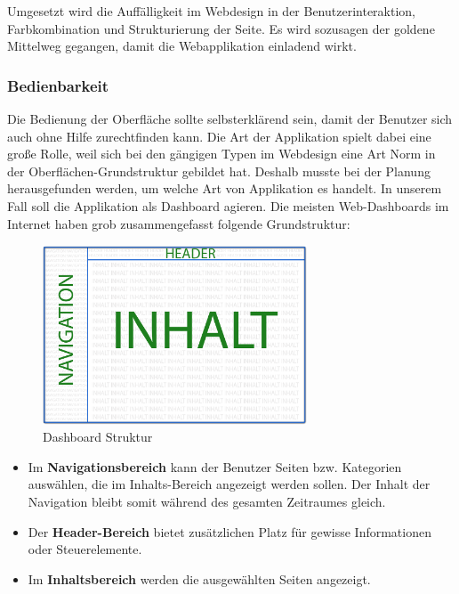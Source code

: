 Umgesetzt wird die Auffälligkeit im Webdesign in der Benutzerinteraktion, Farbkombination und Strukturierung der Seite. Es wird sozusagen der goldene Mittelweg gegangen, damit die Webapplikation einladend wirkt.

\subsubsection{Bedienbarkeit}
\label{sec:bedienbarkeit}
Die Bedienung der Oberfläche sollte selbsterklärend sein, damit der Benutzer sich auch ohne Hilfe zurechtfinden kann. Die Art der Applikation spielt dabei eine große Rolle, weil sich bei den gängigen Typen im Webdesign eine Art Norm in der Oberflächen-Grundstruktur gebildet hat. Deshalb musste bei der Planung herausgefunden werden, um welche Art von Applikation es handelt. 
In unserem Fall soll die Applikation als Dashboard agieren. Die meisten Web-Dashboards im Internet haben grob zusammengefasst folgende Grundstruktur:

\begin{figure}[ht]
    \centering
	\includegraphics[width=0.7\textwidth]{images/dashboard-structure}
	\caption{Dashboard Struktur}
\end{figure}

\begin{itemize}
    \item Im \textbf{Navigationsbereich} kann der Benutzer Seiten bzw. Kategorien auswählen, die im Inhalts-Bereich angezeigt werden sollen. Der Inhalt der Navigation bleibt somit während des gesamten Zeitraumes gleich.
    \item Der \textbf{Header-Bereich} bietet zusätzlichen Platz für gewisse Informationen oder Steuerelemente.
    \item Im \textbf{Inhaltsbereich} werden die ausgewählten Seiten angezeigt.
\end{itemize}

